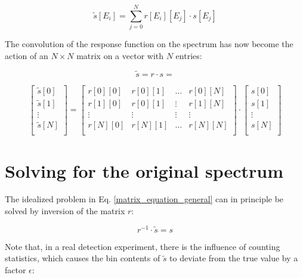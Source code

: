 \documentclass{article}
\begin{document}
\begin{equation}
	\label{convolution_discrete}
	\tilde{s}[E_i] = \sum_{j = 0}^{N} r[E_i][E_j] \cdot s[E_j]
\end{equation}

The convolution of the response function on the spectrum has now become the action of an $N \times N$ matrix on a vector with $N$ entries:

\begin{equation}
	\label{matrix_equation_general}
	\tilde{s} = r \cdot s = 
\end{equation}

\begin{equation}
	\label{matrix_equation_explicit}
	\left[ 
		\begin{array}{c}
			\tilde{s}[0] \\
			\tilde{s}[1] \\
			\vdots	\\
			\tilde{s}[N] \\
		\end{array}
	\right]
	= 
	\begin{bmatrix}
		r[0][0] & r[0][1] & \hdots & r[0][N] \\
		r[1][0] & r[0][1] & \vdots & r[1][N] \\
		\vdots  & \vdots  & \vdots & \vdots  \\
		r[N][0] & r[N][1] & \hdots & r[N][N] \\
	\end{bmatrix}
	\cdot
	\left[ 
		\begin{array}{c}
			s[0] \\
			s[1] \\
			\vdots	\\
			s[N] \\
		\end{array}
	\right]
\end{equation}

\section{Solving for the original spectrum}

The idealized problem in Eq. \ref{matrix_equation_general} can in principle be solved by inversion of the matrix $r$:

\begin{equation}
	\label{matrix_equation_solved}
	r^{-1} \cdot \tilde{s} = s
\end{equation}

Note that, in a real detection experiment, there is the influence of counting statistics, which causes the bin contents of $\tilde{s}$ to deviate from the true value by a factor $\epsilon$:
\end{document}
